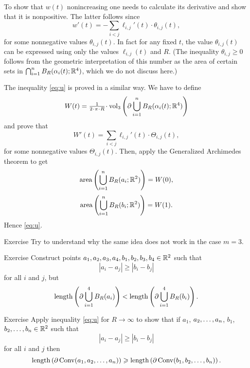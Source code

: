 To show that $w(t)$ nonincreasing one needs to calculate its derivative and show that it is nonpositive.
The latter follows since 
$$w'(t)=-\sum_{i<j} \ell_{i,j}'(t)\cdot \theta_{i,j}(t),
$$ 
for some nonnegative values $\theta_{i,j}(t)$.
In fact for any fixed $t$, the value $\theta_{i,j}(t)$ can be expressed using only the values $\ell_{i,j}(t)$ and $R$.
(The inequality $\theta_{i,j}\ge 0$ follows from the geometric interpretation of this number as the area of certain sets in  $\bigcap_{i=1}^n B_R(\alpha_i(t);\mathbb{R}^4)$, which we do not discuss here.) 


The inequality \ref{eq:u} is proved in a similar way.
We have to define 
$$W(t)=\tfrac{1}{2\cdot\pi\cdot R}\cdot\vol_3\left(\partial \bigcup_{i=1}^n B_R(\alpha_i(t);\RR^4)\right)$$
and prove that 
$$W'(t)=\sum_{i<j} \ell_{i,j}'(t)\cdot \Theta_{i,j}(t),
$$
for some nonnegative values $\Theta_{i,j}(t)$.
Then, apply the Generalized Archimedes theorem to get
$$\operatorname{area} \left(\bigcup_{i=1}^n B_R(a_i;\mathbb{R}^2)\right)=W(0),$$
$$\operatorname{area} \left(\bigcup_{i=1}^n B_R(b_i;\mathbb{R}^2)\right)=W(1).$$
Hence \ref{eq:u}.

\begin{thm}{Exercise}\label{ex:try3dim}
Try to understand why the same idea does not work in the case $m=3$.
\end{thm}

\begin{thm}{Exercise}\label{ex:try-a4}
Construct points $a_1,a_2,a_3,a_4,b_1,b_2,b_3,b_4\in\mathbb{R}^2$ such that 
$$|a_i-a_j|\ge |b_i-b_j|$$
for all $i$ and $j$, but
$$\operatorname{length} \left(\partial\bigcup_{i=1}^4 B_R(a_i)\right)
<
\operatorname{length} \left(\partial\bigcup_{i=1}^4 B_R(b_i)\right).$$

\end{thm}

\begin{thm}{Exercise}\label{ex:try-R-infty}
Apply inequality \ref{eq:u} for $R\to \infty$ to show that 
if $a_1$, $a_2,\z\dots,a_n$, $b_1$, $b_2,\z\dots,b_n\in\RR^2$ such that 
$$|a_i-a_j|\ge |b_i-b_j|$$
for all $i$ and $j$ then
$$\operatorname{length} \left(\partial\operatorname{Conv}(a_1,a_2,\dots,a_n)\right)\geqslant \operatorname{length} \left(\partial\operatorname{Conv}(b_1,b_2,\dots,b_n)\right).$$

\end{thm}





